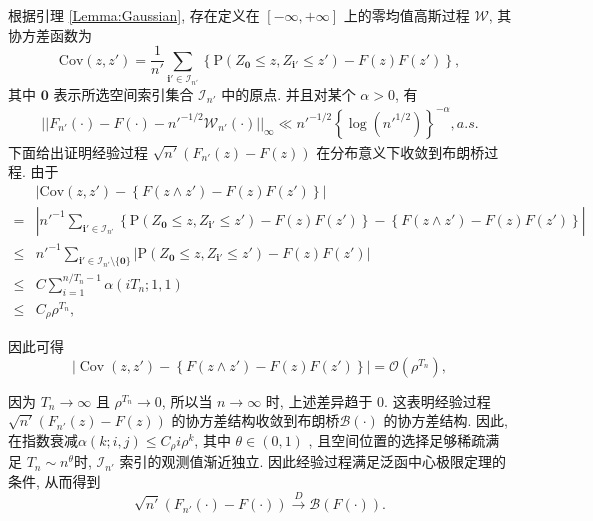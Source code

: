 \documentclass[a4paper,openay,14pt]{ctexbook}
\numberwithin{equation}{section}
\numberwithin{lem}{section}
\begin{document}
    根据引理 \ref{Lemma:Gaussian}, 存在定义在 $[-\infty,+\infty]$ 上的零均值高斯过程 $\mathcal{W}$, 其协方差函数为
$$\text{Cov} (z,z')=\frac{1}{n'}\sum_{\mathbf{i}'\in \mathcal{I}_{n'}}\left\{\mathrm{P}\left(Z_{\mathbf{0}}\le z, Z_{\mathbf{i}'}\le z'\right)-F(z)F(z')\right\},$$ 
其中 $\mathbf{0}$ 表示所选空间索引集合 $\mathcal{I}_{n'}$ 中的原点. 并且对某个 $\alpha>0$, 有
\begin{align}
||F_{n'}(\cdot)-F(\cdot)-n'^{-1/2}\mathcal{W}_{n'}(\cdot)||_{\infty}\ll n'^{-1/2}\left\{\log (n'^{1/2})\right\}^{-\alpha},  a.s.  
\label{EQ:gaussianprocess}
\end{align}
下面给出证明经验过程 $\sqrt{n'}(F_{n'}(z) - F(z))$ 在分布意义下收敛到布朗桥过程. 由于  
\begin{align*}
    &\left| \text{Cov}(z, z') - \left\{F(z \wedge z') - F(z)F(z')\right\} \right| \\
    = &\left| n'^{-1} \sum_{\mathbf{i}' \in \mathcal{I}_{n'}} \left\{\mathrm{P}(Z_{\mathbf{0}} \le z, Z_{\mathbf{i}'} \le z') - F(z)F(z')\right\} - \left\{F(z \wedge z') - F(z)F(z')\right\} \right| \\
    \le &n'^{-1} \sum_{\mathbf{i}' \in \mathcal{I}_{n'} \setminus \{\mathbf{0}\}} \left| \mathrm{P}(Z_{\mathbf{0}} \le z, Z_{\mathbf{i}'} \le z') - F(z)F(z') \right| \\
    \le &C \sum_{i=1}^{n/T_n - 1} \alpha(iT_n; 1, 1) \\
    \le &C_{\rho} \rho^{T_n},
\end{align*}

因此可得
\begin{equation}\label{EQU:cov}
    \left| \operatorname{Cov}(z, z') - \left\{ F(z \wedge z') - F(z)F(z') \right\} \right| = \mathcal{O}(\rho^{T_n}),
\end{equation}

因为 $ T_n \to \infty $ 且 $ \rho^{T_n} \to 0 $, 所以当 $ n \to \infty $ 时, 上述差异趋于 0. 这表明经验过程 $\sqrt{n'}(F_{n'}(z) - F(z))$ 的协方差结构收敛到布朗桥$\mathcal{B}(\cdot)$ 的协方差结构. 因此, 在指数衰减$\alpha(k; i, j) \leq C_\rho i \rho^k$, 其中 $\theta \in (0,1)$ , 且空间位置的选择足够稀疏满足 $T_n \sim n^{\theta}$时, $\mathcal{I}_{n'}$ 索引的观测值渐近独立. 因此经验过程满足泛函中心极限定理的条件, 从而得到
\[
\sqrt{n'}(F_{n'}(\cdot) - F(\cdot)) \overset{D}{\longrightarrow} \mathcal{B}(F(\cdot)).
\]




\end{document}
